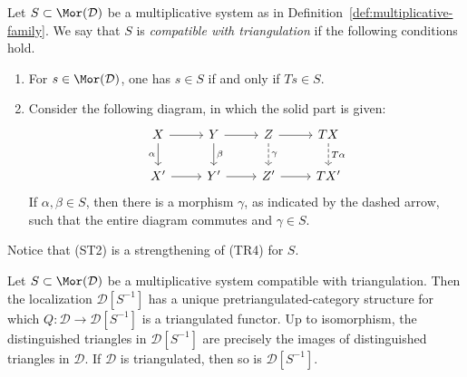 \begin{definition}
	Let $S \subset \Mor(\mathcal{D})$ be a multiplicative system as in
	Definition~\ref{def:multiplicative-family}. We say that $S$ is
	\emph{compatible with triangulation} if the following conditions hold.
	\begin{enumerate}[(ST1)]
		\item For $s \in \Mor(\mathcal{D})$, one has $s \in S$ if and only if
		$Ts \in S$.
		\item Consider the following diagram, in which the solid part is
		given:
		\[\begin{tikzcd}
			X \arrow[d, "\alpha"'] \arrow[r] & Y \arrow[d, "\beta"] \arrow[r] & Z \arrow[dashed, d, "\gamma"] \arrow[r] & TX \arrow[dashed, d, "T\alpha"] \\
			X' \arrow[r] & Y' \arrow[r] & Z' \arrow[r] & TX'
		\end{tikzcd}\]
		If $\alpha, \beta \in S$, then there is a morphism $\gamma$, as
		indicated by the dashed arrow, such that the entire diagram commutes
		and $\gamma \in S$.
	\end{enumerate}
\end{definition}

Notice that (ST2) is a strengthening of (TR4) for $S$.

\begin{proposition}\label{prop:localization-triangulated}
	Let $S \subset \Mor(\mathcal{D})$ be a multiplicative system compatible
	with triangulation. Then the localization $\mathcal{D}[S^{-1}]$ has a
	unique pretriangulated-category structure for which
	$Q: \mathcal{D} \to \mathcal{D}[S^{-1}]$ is a triangulated functor.
	Up to isomorphism, the distinguished triangles in
	$\mathcal{D}[S^{-1}]$ are precisely the images of distinguished
	triangles in $\mathcal{D}$. If $\mathcal{D}$ is triangulated, then so is
	$\mathcal{D}[S^{-1}]$.
\end{proposition}

